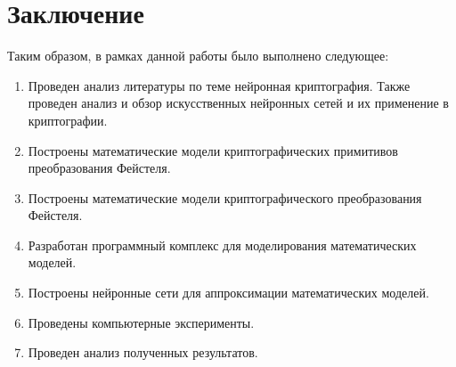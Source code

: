 \chapter*{Заключение}
\label{c:conclusion}

Таким образом, в рамках данной работы было выполнено следующее:
\begin{enumerate}
	\item Проведен анализ литературы по теме нейронная криптография. Также проведен анализ и обзор искусственных нейронных сетей и их применение в криптографии.
	\item Построены математические модели криптографических примитивов преобразования Фейстеля.
	\item Построены математические модели криптографического преобразования Фейстеля.
	\item Разработан программный комплекс для моделирования математических моделей.
	\item Построены нейронные сети для аппроксимации математических моделей.
	\item Проведены компьютерные эксперименты.
	\item Проведен анализ полученных результатов.
	
\end{enumerate}